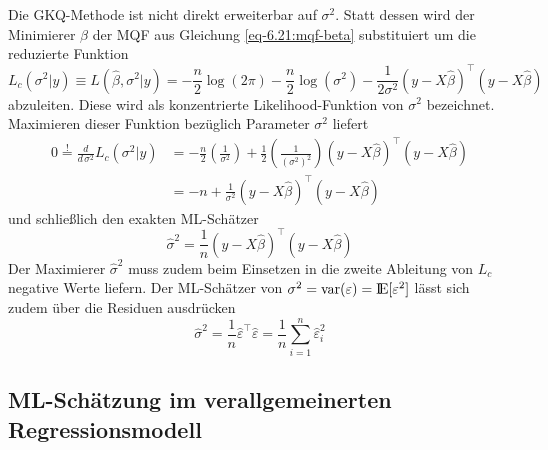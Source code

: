 Die GKQ-Methode ist nicht direkt erweiterbar auf $\sigma^2$. Statt dessen 
wird der Minimierer $\hat{\beta}$ der MQF aus Gleichung \eqref{eq-6.21:mqf-beta} substituiert 
um die reduzierte Funktion
\begin{equation*}
    L_c(\sigma^{2}|y) \equiv L(\hat{\beta},\sigma^{2}|y)=-\frac{n}{2} \operatorname{log}(2\pi) 
    -\frac{n}{2} \operatorname{log}(\sigma^{2})
    -\frac{1}{2\sigma^{2}} \left( y-X \hat{\beta} \right)^{\top} \left( y-X \hat{\beta} \right)
\end{equation*}
abzuleiten. Diese wird als konzentrierte Likelihood-Funktion von $\sigma^2$ bezeichnet. 
Maximieren dieser Funktion bezüglich Parameter $\sigma^2$ liefert 
\begin{align*}
    0 \overset{!}{=} \frac{d}{d \, \sigma^2} L_c(\sigma^{2}|y) &= -\frac{n}{2} \left(\frac{1}{\sigma^{2}}\right) 
    + \frac{1}{2} \left(\frac{1}{(\sigma^{2})^2}\right) \left( y-X \hat{\beta} \right)^{\top} \left( y-X \hat{\beta} \right)\\
    &=-n + \frac{1}{\sigma^{2}} \left( y-X \hat{\beta} \right)^{\top} \left( y-X \hat{\beta} \right)
\end{align*}
und schließlich den exakten ML-Schätzer 
\begin{equation*}
    \hat{\sigma}^{2}=\frac{1}{n} \left( y-X \hat{\beta} \right)^{\top} \left( y-X \hat{\beta} \right)
\end{equation*}
Der Maximierer $\hat{\sigma}^{2}$ muss zudem beim Einsetzen in die zweite 
Ableitung von $L_c$ negative Werte liefern.
Der ML-Schätzer von $\sigma^2=\operatorname{var}(\varepsilon)={\rm I\!E}[\varepsilon^2]$ lässt sich zudem über 
die Residuen ausdrücken
\begin{equation*}
    \hat{\sigma}^{2}= \frac{1}{n} \hat{\varepsilon}^{\top} \hat{\varepsilon}=\frac{1}{n} \sum_{i=1}^{n} \hat{\varepsilon}_{i}^2
\end{equation*}

\subsection{ML-Schätzung im verallgemeinerten Regressionsmodell}

